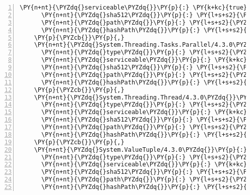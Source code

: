 \begin{Verbatim}[commandchars=\\\{\},numbers=left,firstnumber=1,stepnumber=1,numberblanklines=0]
      \PY{n+nt}{\PYZdq{}serviceable\PYZdq{}}\PY{p}{:} \PY{k+kc}{true}\PY{p}{,}
      \PY{n+nt}{\PYZdq{}sha512\PYZdq{}}\PY{p}{:} \PY{l+s+s2}{\PYZdq{}sha512\PYZhy{}bSdzApnH8MW9p4EkkOz06Vemi3GVX6O0YT707+BxZKiLGGZy9rWIBJWyPmvOLpUglC/P13rpMMGU1qWtpBN8dQ==\PYZdq{}}\PY{p}{,}
      \PY{n+nt}{\PYZdq{}path\PYZdq{}}\PY{p}{:} \PY{l+s+s2}{\PYZdq{}system.threading.tasks.extensions/4.5.0\PYZhy{}rc1\PYZdq{}}\PY{p}{,}
      \PY{n+nt}{\PYZdq{}hashPath\PYZdq{}}\PY{p}{:} \PY{l+s+s2}{\PYZdq{}system.threading.tasks.extensions.4.5.0\PYZhy{}rc1.nupkg.sha512\PYZdq{}}
    \PY{p}{\PYZcb{}}\PY{p}{,}
    \PY{n+nt}{\PYZdq{}System.Threading.Tasks.Parallel/4.3.0\PYZdq{}}\PY{p}{:} \PY{p}{\PYZob{}}
      \PY{n+nt}{\PYZdq{}type\PYZdq{}}\PY{p}{:} \PY{l+s+s2}{\PYZdq{}package\PYZdq{}}\PY{p}{,}
      \PY{n+nt}{\PYZdq{}serviceable\PYZdq{}}\PY{p}{:} \PY{k+kc}{true}\PY{p}{,}
      \PY{n+nt}{\PYZdq{}sha512\PYZdq{}}\PY{p}{:} \PY{l+s+s2}{\PYZdq{}sha512\PYZhy{}cbjBNZHf/vQCfcdhzx7knsiygoCKgxL8mZOeocXZn5gWhCdzHIq6bYNKWX0LAJCWYP7bds4yBK8p06YkP0oa0g==\PYZdq{}}\PY{p}{,}
      \PY{n+nt}{\PYZdq{}path\PYZdq{}}\PY{p}{:} \PY{l+s+s2}{\PYZdq{}system.threading.tasks.parallel/4.3.0\PYZdq{}}\PY{p}{,}
      \PY{n+nt}{\PYZdq{}hashPath\PYZdq{}}\PY{p}{:} \PY{l+s+s2}{\PYZdq{}system.threading.tasks.parallel.4.3.0.nupkg.sha512\PYZdq{}}
    \PY{p}{\PYZcb{}}\PY{p}{,}
    \PY{n+nt}{\PYZdq{}System.Threading.Thread/4.3.0\PYZdq{}}\PY{p}{:} \PY{p}{\PYZob{}}
      \PY{n+nt}{\PYZdq{}type\PYZdq{}}\PY{p}{:} \PY{l+s+s2}{\PYZdq{}package\PYZdq{}}\PY{p}{,}
      \PY{n+nt}{\PYZdq{}serviceable\PYZdq{}}\PY{p}{:} \PY{k+kc}{true}\PY{p}{,}
      \PY{n+nt}{\PYZdq{}sha512\PYZdq{}}\PY{p}{:} \PY{l+s+s2}{\PYZdq{}sha512\PYZhy{}OHmbT+Zz065NKII/ZHcH9XO1dEuLGI1L2k7uYss+9C1jLxTC9kTZZuzUOyXHayRk+dft9CiDf3I/QZ0t8JKyBQ==\PYZdq{}}\PY{p}{,}
      \PY{n+nt}{\PYZdq{}path\PYZdq{}}\PY{p}{:} \PY{l+s+s2}{\PYZdq{}system.threading.thread/4.3.0\PYZdq{}}\PY{p}{,}
      \PY{n+nt}{\PYZdq{}hashPath\PYZdq{}}\PY{p}{:} \PY{l+s+s2}{\PYZdq{}system.threading.thread.4.3.0.nupkg.sha512\PYZdq{}}
    \PY{p}{\PYZcb{}}\PY{p}{,}
    \PY{n+nt}{\PYZdq{}System.ValueTuple/4.3.0\PYZdq{}}\PY{p}{:} \PY{p}{\PYZob{}}
      \PY{n+nt}{\PYZdq{}type\PYZdq{}}\PY{p}{:} \PY{l+s+s2}{\PYZdq{}package\PYZdq{}}\PY{p}{,}
      \PY{n+nt}{\PYZdq{}serviceable\PYZdq{}}\PY{p}{:} \PY{k+kc}{true}\PY{p}{,}
      \PY{n+nt}{\PYZdq{}sha512\PYZdq{}}\PY{p}{:} \PY{l+s+s2}{\PYZdq{}sha512\PYZhy{}cNLEvBX3d6MMQRZe3SMFNukVbitDAEpVZO17qa0/2FHxZ7Y7PpFRpr6m2615XYM/tYYYf0B+WyHNujqIw8Luwg==\PYZdq{}}\PY{p}{,}
      \PY{n+nt}{\PYZdq{}path\PYZdq{}}\PY{p}{:} \PY{l+s+s2}{\PYZdq{}system.valuetuple/4.3.0\PYZdq{}}\PY{p}{,}
      \PY{n+nt}{\PYZdq{}hashPath\PYZdq{}}\PY{p}{:} \PY{l+s+s2}{\PYZdq{}system.valuetuple.4.3.0.nupkg.sha512\PYZdq{}}

\end{Verbatim}
